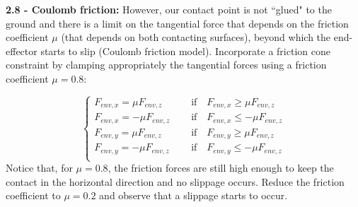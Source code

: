\documentclass[11pt]{article}
\begin{document}
\quad

\noindent
\textbf{ 2.8 - Coulomb friction:} 
However, our contact point is not ``glued" to the ground and there is a limit on the tangential force that depends on the friction coefficient $\mu$ (that depends on both contacting surfaces), 
beyond which the end-effector starts to slip (Coulomb friction model). Incorporate a friction cone constraint by clamping  appropriately the tangential forces using  a friction coefficient $\mu = 0.8$:

\begin{equation*}
\begin{cases}
F_{env, x} = \mu F_{env, z}  \quad &\text{   if}\quad F_{env, x} \geq \mu F_{env, z} \\ 
F_{env, x} = -\mu F_{env, z}  \quad &\text{   if}\quad F_{env, x} \leq -\mu F_{env, z} \\ 
F_{env, y} = \mu F_{env, z}  \quad &\text{   if}\quad F_{env, y} \geq \mu F_{env, z} \\ 
F_{env, y} = -\mu F_{env, z}  \quad &\text{   if}\quad F_{env, y} \leq -\mu F_{env, z} \\ 
\end{cases}
\end{equation*}
%
Notice that, for $\mu = 0.8$, the friction forces are still high enough to keep the contact in the horizontal direction and no slippage occurs.  Reduce the friction coefficient to $\mu = 0.2$ and observe that a slippage starts to occur.
% 
\end{document}
